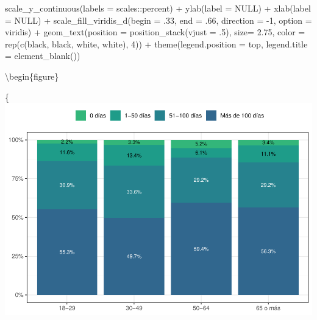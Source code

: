 \documentclass[
  12pt,
]{book}
\newenvironment{Shaded}{\begin{snugshade}}{\end{snugshade}}
\newcommand{\AttributeTok}[1]{\textcolor[rgb]{0.77,0.63,0.00}{#1}}
\newcommand{\ConstantTok}[1]{\textcolor[rgb]{0.00,0.00,0.00}{#1}}
\newcommand{\DecValTok}[1]{\textcolor[rgb]{0.00,0.00,0.81}{#1}}
\newcommand{\FloatTok}[1]{\textcolor[rgb]{0.00,0.00,0.81}{#1}}
\newcommand{\FunctionTok}[1]{\textcolor[rgb]{0.00,0.00,0.00}{#1}}
\newcommand{\NormalTok}[1]{#1}
\newcommand{\SpecialCharTok}[1]{\textcolor[rgb]{0.00,0.00,0.00}{#1}}
\newcommand{\StringTok}[1]{\textcolor[rgb]{0.31,0.60,0.02}{#1}}
\begin{document}
\begin{Shaded}
\begin{Highlighting}[]
  \FunctionTok{scale\_y\_continuous}\NormalTok{(}\AttributeTok{labels =}\NormalTok{ scales}\SpecialCharTok{::}\NormalTok{percent) }\SpecialCharTok{+}
  \FunctionTok{ylab}\NormalTok{(}\AttributeTok{label =} \ConstantTok{NULL}\NormalTok{) }\SpecialCharTok{+}
  \FunctionTok{xlab}\NormalTok{(}\AttributeTok{label =} \ConstantTok{NULL}\NormalTok{) }\SpecialCharTok{+}
  \FunctionTok{scale\_fill\_viridis\_d}\NormalTok{(}\AttributeTok{begin =}\NormalTok{ .}\DecValTok{33}\NormalTok{, }\AttributeTok{end =}\NormalTok{ .}\DecValTok{66}\NormalTok{, }\AttributeTok{direction =} \SpecialCharTok{{-}}\DecValTok{1}\NormalTok{, }\AttributeTok{option =} \StringTok{\textquotesingle{}viridis\textquotesingle{}}\NormalTok{) }\SpecialCharTok{+}
  \FunctionTok{geom\_text}\NormalTok{(}\AttributeTok{position =} \FunctionTok{position\_stack}\NormalTok{(}\AttributeTok{vjust =}\NormalTok{ .}\DecValTok{5}\NormalTok{),}
            \AttributeTok{size=} \FloatTok{2.75}\NormalTok{, }\AttributeTok{color =} \FunctionTok{rep}\NormalTok{(}\FunctionTok{c}\NormalTok{(}\StringTok{\textquotesingle{}black\textquotesingle{}}\NormalTok{, }\StringTok{\textquotesingle{}black\textquotesingle{}}\NormalTok{, }\StringTok{\textquotesingle{}white\textquotesingle{}}\NormalTok{, }\StringTok{\textquotesingle{}white\textquotesingle{}}\NormalTok{), }\DecValTok{4}\NormalTok{)) }\SpecialCharTok{+}
  \FunctionTok{theme}\NormalTok{(}\AttributeTok{legend.position =} \StringTok{\textquotesingle{}top\textquotesingle{}}\NormalTok{,}
        \AttributeTok{legend.title =} \FunctionTok{element\_blank}\NormalTok{())}
\end{Highlighting}
\end{Shaded}

\textbackslash begin\{figure\}

\{\centering \includegraphics{reporte-elsoc_files/figure-latex/dias_cuarentena-edad-1}
\end{document}
